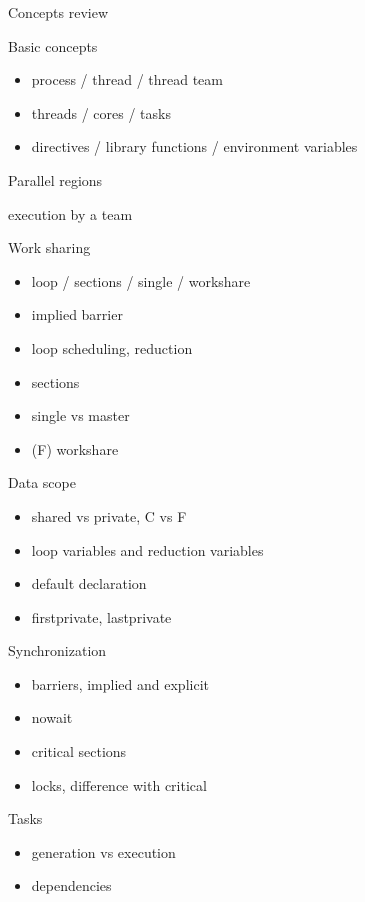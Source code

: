 
 {Concepts review}

\begin{multicols}{2}
 {Basic concepts}

\begin{itemize}
\item
process / thread / thread team
\item
threads / cores / tasks
\item
directives / library functions / environment variables
\end{itemize}

 {Parallel regions}

execution by a team

 {Work sharing}

\begin{itemize}
\item
loop / sections / single / workshare
\item
implied barrier
\item
loop scheduling, reduction
\item
sections
\item
single vs master
\item
(F) workshare
\end{itemize}

 {Data scope}

\begin{itemize}
\item
shared vs private, C vs F
\item
loop variables and reduction variables
\item
default declaration
\item
firstprivate, lastprivate
\end{itemize}

 {Synchronization}

\begin{itemize}
\item
barriers, implied and explicit
\item
nowait
\item
critical sections
\item
locks, difference with critical
\end{itemize}

 {Tasks}

\begin{itemize}
\item
generation vs execution
\item
dependencies
\end{itemize}


\end{multicols}


